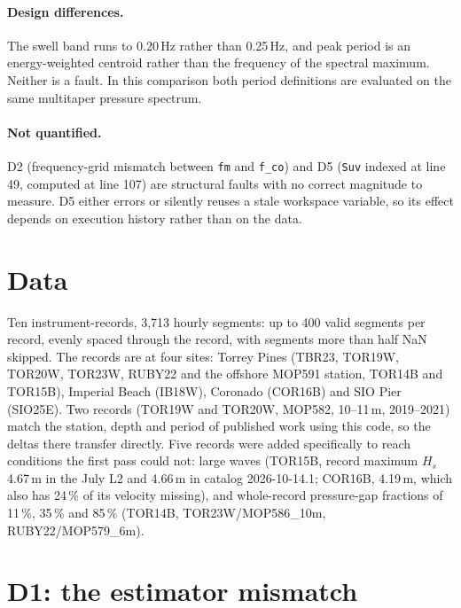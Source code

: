 \documentclass[11pt]{article}
\begin{document}
\paragraph{Design differences.} The swell band runs to 0.20\,Hz rather than
0.25\,Hz, and peak period is an energy-weighted centroid rather than the
frequency of the spectral maximum. Neither is a fault. In this comparison both
period definitions are evaluated on the same multitaper pressure spectrum.

\paragraph{Not quantified.} D2 (frequency-grid mismatch between \texttt{fm} and
\texttt{f\_co}) and D5 (\texttt{Suv} indexed at line 49, computed at line 107)
are structural faults with no correct magnitude to measure. D5 either errors or
silently reuses a stale workspace variable, so its effect depends on execution
history rather than on the data.

\section{Data}

Ten instrument-records, 3{,}713 hourly segments: up to 400 valid segments per
record, evenly spaced through the record, with segments more than half NaN
skipped. The records are at four sites: Torrey Pines (TBR23, TOR19W, TOR20W,
TOR23W, RUBY22 and the offshore MOP591 station, TOR14B and TOR15B), Imperial Beach
(IB18W), Coronado (COR16B) and SIO Pier (SIO25E). Two records (TOR19W and TOR20W,
MOP582, 10--11\,m, 2019--2021) match the station, depth and period of published
work using this code, so the deltas there transfer directly. Five records were
added specifically to reach conditions the first pass could not: large waves
(TOR15B, record maximum $H_s$ 4.67\,m in the July L2 and 4.66\,m in catalog
2026-10-14.1; COR16B, 4.19\,m, which also has 24\,\% of
its velocity missing), and whole-record pressure-gap fractions of 11\,\%, 35\,\%
and 85\,\% (TOR14B, TOR23W/MOP586\_10m, RUBY22/MOP579\_6m).

\section{D1: the estimator mismatch}
\end{document}
